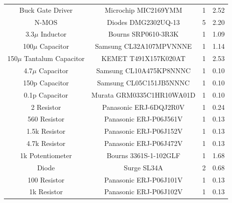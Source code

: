 \documentclass[12pt]{article}
\begin{document}
\begin{table}[!h]
{\begin{tabular}{ |c|c|c|c| }
 		Buck Gate Driver & Microchip MIC2169YMM & 1 & 2.52 \\
 		N-MOS & Diodes DMG2302UQ-13 & 5 & 2.20 \\
 		3.3$\mu$ Inductor & Bourns SRP0610-3R3K & 1 & 1.09 \\
 		100$\mu$ Capacitor & Samsung CL32A107MPVNNNE & 1 & 1.14 \\
 		150$\mu$ Tantalum Capacitor & KEMET T491X157K020AT & 1 & 2.53 \\
 		4.7$\mu$ Capacitor & Samsung CL10A475KP8NNNC & 1 & 0.10 \\
 		150p Capacitor & Samsung CL05C151JB5NNNC & 1 & 0.10 \\
 		0.1p Capacitor & Murata GRM0335C1HR10WA01D & 1 & 0.10 \\
 		2 Resistor & Panasonic ERJ-6DQJ2R0V & 1 & 0.24 \\
 		560 Resistor & Panasonic ERJ-P06J561V & 1 & 0.13 \\
 		1.5k Resistor & Panasonic ERJ-P06J152V & 1 & 0.13 \\
 		4.7k Resistor & Panasonic ERJ-P06J472V & 1 & 0.13 \\
 		1k Potentiometer & Bourns 3361S-1-102GLF & 1 & 1.68 \\
 		Diode & Surge SL34A & 2 & 0.68 \\
 		100 Resistor & Panasonic ERJ-P06J101V & 1 & 0.13 \\
 		1k Resistor & Panasonic ERJ-P06J102V & 1 & 0.13 \\
 		\hline
	\end{tabular}
	}
\end{table}
\end{document}
